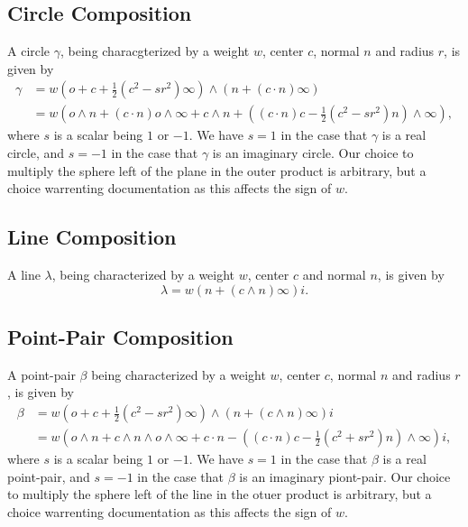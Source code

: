 \documentclass[12pt]{article}
\newcommand{\nvao}{o}
\newcommand{\nvai}{\infty}
\begin{document}
\subsection{Circle Composition}

A circle $\gamma$, being characgterized by a weight $w$, center $c$, normal $n$
and radius $r$, is given by
\begin{align}
\gamma &=w\left(\nvao+c+\frac{1}{2}(c^2-sr^2)\nvai\right)\wedge(n+(c\cdot n)\nvai) \\
 &= w\left(\nvao\wedge n+(c\cdot n)\nvao\wedge\nvai+c\wedge n+
\left((c\cdot n)c - \frac{1}{2}(c^2-sr^2)n\right)\wedge\nvai\right),\label{equ_circle}
\end{align}
where $s$ is a scalar being $1$ or $-1$.  We have $s=1$ in the
case that $\gamma$ is a real circle, and $s=-1$ in the case that
$\gamma$ is an imaginary circle.  Our choice to multiply the sphere
left of the plane in the outer product is arbitrary, but a choice
warrenting documentation as this affects the sign of $w$.

\subsection{Line Composition}

A line $\lambda$, being characterized by a weight $w$, center $c$ and normal $n$, is
given by
\begin{equation}\label{equ_line}
\lambda = w\left(n + (c\wedge n)\nvai\right)i.
\end{equation}

\subsection{Point-Pair Composition}

A point-pair $\beta$ being characterized by a weight $w$, center $c$, normal $n$
and radius $r$, is given by
\begin{align}
\beta &= w\left(\nvao + c + \frac{1}{2}(c^2-sr^2)\nvai\right)\wedge(n+(c\wedge n)\nvai)i \\
 &= w\left(\nvao\wedge n+c\wedge n\wedge\nvao\wedge\nvai + c\cdot n -
\left((c\cdot n)c-\frac{1}{2}(c^2+sr^2)n\right)\wedge\nvai\right)i,\label{equ_pointpair}
\end{align}
where $s$ is a scalar being $1$ or $-1$.  We have $s=1$ in the case
that $\beta$ is a real point-pair, and $s=-1$ in the case that $\beta$ is an imaginary piont-pair.
Our choice to multiply the sphere left of the line in the otuer product is arbitrary, but a
choice warrenting documentation as this affects the sign of $w$.
\end{document}
